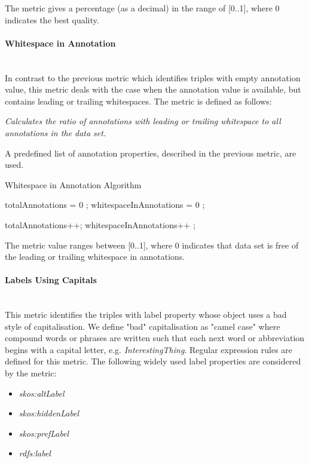 The metric gives a percentage (as a decimal) in the range of [0..1], where 0 indicates the best quality.

\paragraph{Whitespace in Annotation}~\\
In contrast to the previous metric which identifies triples with empty annotation value, this metric deals with the case when the annotation value is available, but contains leading or trailing whitespaces.
The metric is defined as follows:

\begin{mdframed}[style=metricdefinition]
\emph{Calculates the ratio of annotations with leading or trailing whitespace to all annotations in the data set.}
\end{mdframed}

A predefined list of annotation properties, described in the previous metric, are used. 

\begin{algorithm}
\caption{Whitespace in Annotation Algorithm}\label{lst:whitespace}
\begin{algorithmic}[1]
\State totalAnnotations = 0 ;
\State whitespaceInAnnotations = 0 ;
\EndProcedure

 totalAnnotations++; \EndIf
{} whitespaceInAnnotations++ ; \EndIf
{}
\EndProcedure
\end{algorithmic}
\end{algorithm}

The metric value ranges between [0..1], where  0 indicates that data set is free of the leading or trailing whitespace in annotations.

\paragraph{Labels Using Capitals}~\\
This metric identifies the triples with label property whose object uses a bad style of capitalisation. 
We define "bad" capitalisation as "camel case" where compound words or phrases  are written such that each next word or abbreviation begins with a capital letter, e.g. \textit{InterestingThing}.
Regular expression rules are defined for this metric.
The following widely used label properties are considered by the metric:
\begin{itemize}
\item \textit{skos:altLabel}
\item \textit{skos:hiddenLabel}
\item \textit{skos:prefLabel}
\item \textit{rdfs:label}
\end{itemize}

